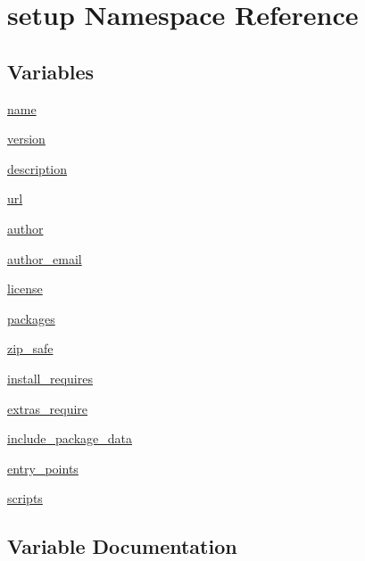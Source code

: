\hypertarget{namespacesetup}{}\section{setup Namespace Reference}
\label{namespacesetup}
\subsection*{Variables}
\begin{DoxyCompactItemize}
\item 
\mbox{\hyperlink{namespacesetup_ab3a7a0638d76a01367c5bc3cc699447f}{name}}
\item 
\mbox{\hyperlink{namespacesetup_a2aa722b36a933088812b50ea79b97a5c}{version}}
\item 
\mbox{\hyperlink{namespacesetup_aedf461ec52a946bda975938ba0b93ec0}{description}}
\item 
\mbox{\hyperlink{namespacesetup_afc13124aa5c0124e84e1d965e3f4b0fb}{url}}
\item 
\mbox{\hyperlink{namespacesetup_a3a57a4772d418a06835249cbade0d86a}{author}}
\item 
\mbox{\hyperlink{namespacesetup_a5b08034343aa2be607722a8b315f3625}{author\+\_\+email}}
\item 
\mbox{\hyperlink{namespacesetup_a8ed6f50a28bd6a8794f8e1153baa6de9}{license}}
\item 
\mbox{\hyperlink{namespacesetup_aff2375a361fd5865c77bd9aa093be747}{packages}}
\item 
\mbox{\hyperlink{namespacesetup_a13510753661cb74083a0c664db11dde9}{zip\+\_\+safe}}
\item 
\mbox{\hyperlink{namespacesetup_abead4f26b530856f858f0d44c7cf2588}{install\+\_\+requires}}
\item 
\mbox{\hyperlink{namespacesetup_a5081a5a3f9d0dee597ab99a7fdc362df}{extras\+\_\+require}}
\item 
\mbox{\hyperlink{namespacesetup_a35139105b25ef46629d31888bad595d8}{include\+\_\+package\+\_\+data}}
\item 
\mbox{\hyperlink{namespacesetup_ada7058afc98897f073d3f3b8b9157059}{entry\+\_\+points}}
\item 
\mbox{\hyperlink{namespacesetup_a45010f2cc65cf779c33b8be481626cc7}{scripts}}
\end{DoxyCompactItemize}


\subsection{Variable Documentation}
\mbox{\label{namespacesetup_a3a57a4772d418a06835249cbade0d86a}} 
